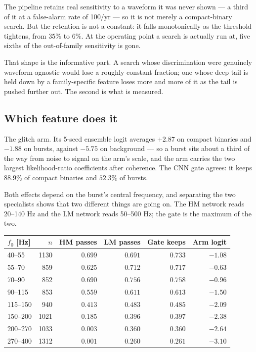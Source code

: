 \documentclass[11pt]{article}
\begin{document}
The pipeline retains real sensitivity to a waveform it was never shown --- a third of it
at a false-alarm rate of 100/yr --- so it is not merely a compact-binary search. But the
retention is not a constant: it falls monotonically as the threshold tightens, from
$35\%$ to $6\%$. At the operating point a search is actually run at, five sixths of the
out-of-family sensitivity is gone.

That shape is the informative part. A search whose discrimination were genuinely
waveform-agnostic would lose a roughly constant fraction; one whose deep tail is held
down by a family-specific feature loses more and more of it as the tail is pushed
further out. The second is what is measured.

\subsection*{Which feature does it}

The glitch arm. Its 5-seed ensemble logit averages $+2.87$ on compact binaries and
$-1.88$ on bursts, against $-5.75$ on background --- so a burst sits about a third of the
way from noise to signal on the arm's scale, and the arm carries the two largest
likelihood-ratio coefficients after coherence. The CNN gate agrees: it keeps $88.9\%$ of
compact binaries and $52.3\%$ of bursts.

Both effects depend on the burst's central frequency, and separating the two
specialists shows that two different things are going on. The HM network reads 20--140 Hz
and the LM network reads 50--500 Hz; the gate is the maximum of the two.

\begin{center}
\begin{tabular}{lrrrrr}
\toprule
$f_0$ [Hz] & $n$ & HM passes & LM passes & Gate keeps & Arm logit \\
\midrule
40--55   & 1130 & $0.699$ & $0.691$ & $0.733$ & $-1.08$ \\
55--70   &  859 & $0.625$ & $0.712$ & $0.717$ & $\mathbf{-0.63}$ \\
70--90   &  852 & $0.690$ & $\mathbf{0.756}$ & $\mathbf{0.758}$ & $-0.96$ \\
90--115  &  853 & $0.559$ & $0.611$ & $0.613$ & $-1.50$ \\
115--150 &  940 & $0.413$ & $0.483$ & $0.485$ & $-2.09$ \\
150--200 & 1021 & $0.185$ & $0.396$ & $0.397$ & $-2.38$ \\
200--270 & 1033 & $0.003$ & $0.360$ & $0.360$ & $-2.64$ \\
270--400 & 1312 & $0.001$ & $0.260$ & $0.261$ & $-3.10$ \\
\bottomrule
\end{tabular}
\end{center}
\end{document}
